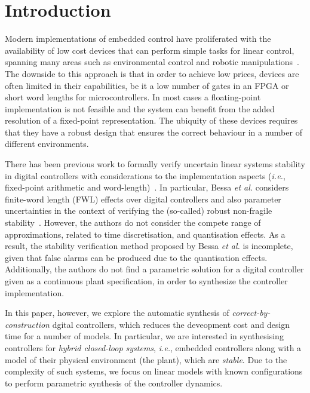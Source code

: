 \documentclass{sig-alternate-05-2015}
\begin{document}
%
%
\printccsdesc



\section{Introduction}

Modern implementations of embedded control have proliferated with the
availability of low cost devices that can perform simple tasks for linear
control, spanning many areas such as environmental control and robotic
manipulations~\cite{astrom1997computer,Franklin15}.  The downside to this
approach is that in order to achieve low prices, devices are often limited
in their capabilities, be it a low number of gates in an FPGA or short word
lengths for microcontrollers.  In most cases a floating-point implementation
is not feasible and the system can benefit from the added resolution of a
fixed-point representation.  The ubiquity of these devices requires that
they have a robust design that ensures the correct behaviour in a number of
different environments.
%

There has been previous work to formally verify uncertain linear systems
stability in digital controllers with considerations to the implementation
aspects ({\it i.e.}, fixed-point arithmetic and word-length)~\cite{Bessa16}. 
In particular, Bessa {\it et al.} considers finite-word length (FWL) effects
over digital controllers and also parameter uncertainties in the context of
verifying the (so-called) robust non-fragile
stability~\cite{bhattacharyya97}.  However, the authors do not consider the
compete range of approximations, related to time discretisation, and
quantisation effects.  As a result, the stability verification method
proposed by Bessa {\it et al.} is incomplete, given that false alarms can be
produced due to the quantisation effects.  Additionally, the authors do not
find a parametric solution for a digital controller given as a continuous
plant specification, in order to synthesize the controller implementation.

In this paper, however, we explore the automatic synthesis of {\em
correct-by-construction} dgital controllers, which reduces the deveopment
cost and design time for a number of models.  In particular, we are
interested in synthesising controllers for {\em hybrid closed-loop systems},
{\it i.e.}, embedded controllers along with a model of their physical
environment (the plant), which are {\em stable}.  Due to the complexity of
such systems, we focus on linear models with known configurations to perform
parametric synthesis of the controller dynamics.
\end{document}
